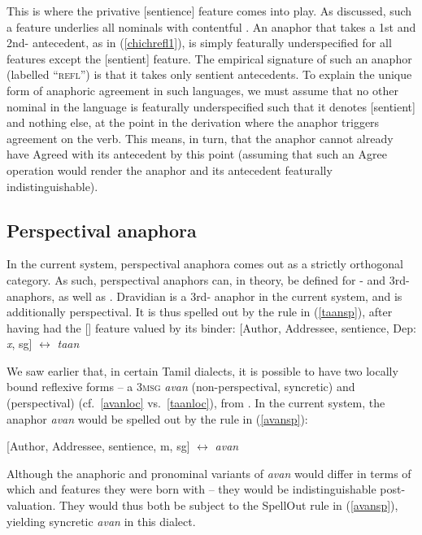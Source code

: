 \documentclass[output=paper, modfonts, nonflat]{langsci/langscibook}
\begin{document}
This is where the privative [sentience] feature comes into play. As
discussed, such a feature underlies all nominals with contentful
\person. An anaphor that takes a 1st and 2nd-\person{} antecedent, as
in (\ref{chichrefl1}), is simply featurally underspecified for all
features except the [sentient] feature. The empirical signature of
such an anaphor (labelled ``\textsc{refl}'') is that it takes only
sentient antecedents. To explain the unique form of anaphoric
agreement in such languages, we must assume that no other nominal in
the language is featurally underspecified such that it denotes
[sentient] and nothing else, at the point in the derivation where the
anaphor triggers agreement on the verb. This means, in turn, that the
anaphor cannot already have Agreed with its antecedent by this point
(assuming that such an Agree operation would render the anaphor and
its antecedent featurally indistinguishable).



        \subsection{Perspectival anaphora}

        
        In the current system, perspectival anaphora comes out as a
        strictly orthogonal category. As such, perspectival anaphors
        can, in theory, be defined for \nul-\person{} and
        3rd-\person{} anaphors, as well as . Dravidian \taan{} is
        a 3rd-\person{} anaphor in the current system, and is
        additionally perspectival. It is thus spelled out by the rule
        in (\ref{taansp}), after having had the [\dep] feature valued
        by its binder: \ea\label{taansp} {[}\textminus Author, \textminus Addressee, sentience,
        Dep: \textit{x}, sg] $\leftrightarrow$ \textit{taan} \z

        \noindent We saw earlier that, in certain Tamil dialects, it is possible
        to have two locally bound reflexive forms -- a \textsc{3msg}
        \textit{avan} (non-perspectival, syncretic) and \taan{}
        (perspectival) (cf.\ \ref{avanloc} vs.\ \ref{taanloc}),
        from \citet{sundaresan:2012}. In the current system, the
        anaphor \textit{avan} would be spelled out by the rule in
        (\ref{avansp}):

        \ea\label{avansp} {[}\textminus Author, \textminus Addressee, sentience, m, sg]
        $\leftrightarrow$ \textit{avan} \z

        \noindent Although the anaphoric and pronominal variants of
        \textit{avan} would differ in terms of which \num{} and
        \gender{} features they were born with -- they would be
        indistinguishable post-valuation. They would thus both be
        subject to the SpellOut rule in (\ref{avansp}), yielding
        syncretic \textit{avan} in this dialect.
\end{document}
